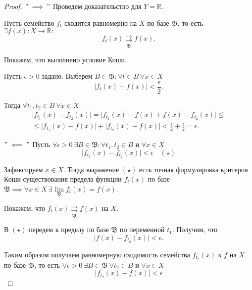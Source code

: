 \documentclass{report}
\theoremstyle{definition}
\begin{document}
\begin{proof}
  $"\implies"$ Проведем доказательство для $Y = \mathbb{R}$.

  Пусть семейство $f_t$ сходится равномерно на $X$ по базе $\mathfrak{B}$, то есть $\exists f(x): X \rightarrow \mathbb{R}:$
  \begin{equation*}
    f_t(x) \underset{\mathfrak{B}}{\rightrightarrows}f(x).
  \end{equation*}

  Покажем, что выполнено условие Коши.

  Пусть $\epsilon > 0$ задано. Выберем $B \in \mathfrak{B}: \forall t \in B \ \forall x \in X$
  \begin{equation*}
    \big|f_t(x) - f(x)\big| < \frac{\epsilon}{2}.
  \end{equation*}

  Тогда $\forall t_1, t_2 \in B \ \forall x \in X$.
  \begin{multline*}
    \big|f_{t_1}(x) - f_{t_2}(x)\big| = \big|f_{t_1}(x) - f(x) + f(x) - f_{t_2}(x)\big| \leqslant \\
    \leqslant \big|f_{t_1}(x) - f(x)\big| + \big|f_{t_2}(x) - f(x)\big| < \frac{\epsilon}{2} + \frac{\epsilon}{2} = \epsilon.
  \end{multline*}

  $"\impliedby"$ Пусть $\forall \epsilon > 0 \ \exists B \in \mathfrak{B}: \forall t_1,t_2 \in B$ и $\forall x \in X$
  \begin{equation*}
    \big|f_{t_1}(x) - f_{t_2}(x)\big| < \epsilon \quad (\star)
  \end{equation*}

  Зафиксируем $x \in X$. Тогда выражение $(\star)$ есть точная формулировка критерия Коши существования предела функции $f_t(x)$ по базе $\mathfrak{B} \implies \forall x \in X \ \exists \underset{\mathfrak{B}}{\lim}f_t(x) = f(x)$.

  Покажем, что $f_t(x) \underset{\mathfrak{B}}{\rightrightarrows}f(x)$ на $X$.

  В $(\star)$ передем к пределу по базе $\mathfrak{B}$ по переменной $t_1$. Получим, что
  \begin{equation*}
    \big|f(x) - f_{t_2}(x)\big| < \epsilon.
  \end{equation*}

  Таким образом получаем равномерную сходимость семейства $f_{t_2}(x)$ к $f$ на $X$ по базе $\mathfrak{B}$, то есть $\forall \epsilon > 0 \ \exists B \in \mathfrak{B} \ \forall t_2 \in B$ и $\forall x \in X$
  \begin{equation*}
    \big|f_{t_2}(x) - f(x)\big| < \epsilon
  \end{equation*}
\end{proof}
\end{document}

